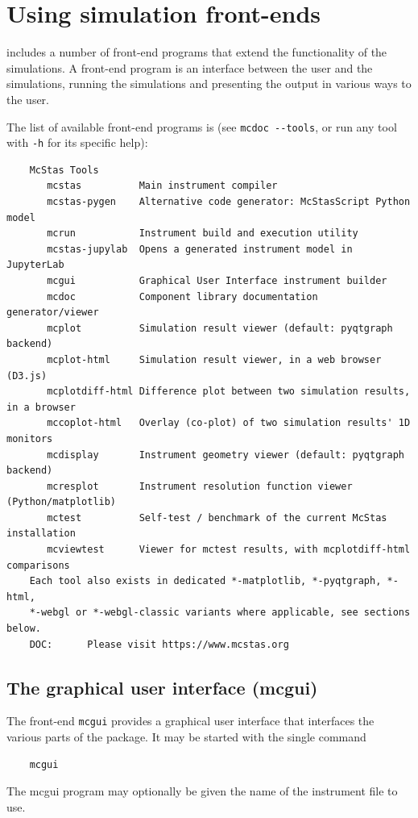 \section{Using simulation front-ends}
\label{s:frontends}

\MCS includes a number of front-end programs that extend the
functionality of the simulations. A front-end program is an interface
between the user and the simulations, running the simulations and
presenting the output in various ways to the user.

The list of available \MCS front-end programs is (see \verb+mcdoc --tools+, or
run any tool with \verb+-h+ for its specific help):
\begin{lstlisting}
    McStas Tools
       mcstas          Main instrument compiler
       mcstas-pygen    Alternative code generator: McStasScript Python model
       mcrun           Instrument build and execution utility
       mcstas-jupylab  Opens a generated instrument model in JupyterLab
       mcgui           Graphical User Interface instrument builder
       mcdoc           Component library documentation generator/viewer
       mcplot          Simulation result viewer (default: pyqtgraph backend)
       mcplot-html     Simulation result viewer, in a web browser (D3.js)
       mcplotdiff-html Difference plot between two simulation results, in a browser
       mccoplot-html   Overlay (co-plot) of two simulation results' 1D monitors
       mcdisplay       Instrument geometry viewer (default: pyqtgraph backend)
       mcresplot       Instrument resolution function viewer (Python/matplotlib)
       mctest          Self-test / benchmark of the current McStas installation
       mcviewtest      Viewer for mctest results, with mcplotdiff-html comparisons
    Each tool also exists in dedicated *-matplotlib, *-pyqtgraph, *-html,
    *-webgl or *-webgl-classic variants where applicable, see sections below.
    DOC:      Please visit https://www.mcstas.org
\end{lstlisting}

\subsection{The graphical user interface (mcgui)}
\label{s:mcgui}

The front-end \verb+mcgui+ provides a graphical user interface that interfaces
the various parts of the \MCS package. It may be started with the single
command
\begin{lstlisting}
    mcgui
\end{lstlisting}
The mcgui program may optionally be given the name of the
instrument file to use.

